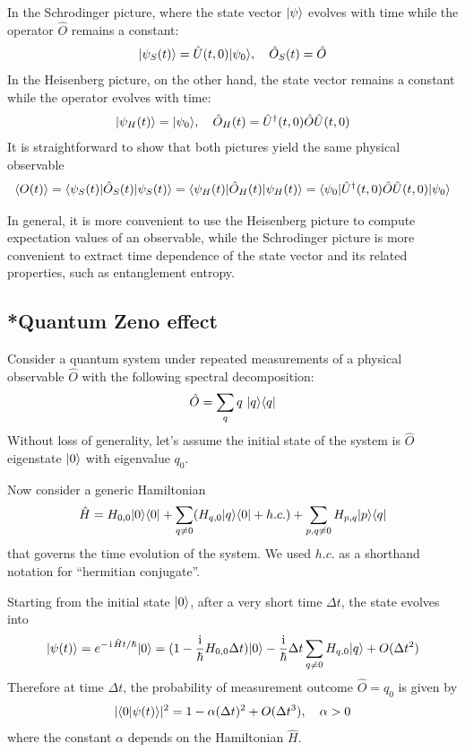 In the Schrodinger picture, where the state vector $|{\psi}\rangle$ evolves with time while the operator $\hat O$ remains a constant:
\begin{align}
    |{\psi_S(t)}\rangle=\hat U(t,0)|{\psi_0}\rangle,~~~\hat O_S(t)=\hat O
\end{align}
In the Heisenberg picture, on the other hand, the state vector remains a constant while the operator evolves with time:
\begin{align}
    |{\psi_H(t)}\rangle=|{\psi_0}\rangle,~~~\hat O_H(t)=\hat U^\dagger(t,0)\hat O\hat U(t,0)
\end{align}
It is straightforward to show that both pictures yield the same physical observable
\begin{align}
    \langle{O(t)}\rangle=\langle{\psi_S(t)|\hat O_S(t)|\psi_S(t)}\rangle=\langle{\psi_H(t)|\hat O_H(t)|\psi_H(t)}\rangle=\langle{\psi_0|\hat U^\dagger(t,0)\hat O\hat U(t,0)|\psi_0}\rangle
\end{align}

In general, it is more convenient to use the Heisenberg picture to compute expectation values of an observable, while the Schrodinger picture is more convenient to extract time dependence of the state vector and its related properties, such as entanglement entropy.

\subsection{*Quantum Zeno effect}

Consider a quantum system under repeated measurements of a physical observable $\hat O$ with the following spectral decomposition:
\begin{align}
    \hat O=\sum_q q~|{q}\rangle\langle{q}|
\end{align}
Without loss of generality, let's assume the initial state of the system is $\hat O$ eigenstate $|{0}\rangle$ with eigenvalue $q_0$. 

Now consider a generic Hamiltonian
\begin{align}
    \hat H=H_{0,0}|{0}\rangle\langle{0}|+\sum_{q\neq0}(H_{q,0}|{q}\rangle\langle{0}|+h.c.)+\sum_{p,q\neq0}H_{p,q}|{p}\rangle\langle{q}|
\end{align}
that governs the time evolution of the system. We used $h.c.$ as a shorthand notation for ``hermitian conjugate''. 

Starting from the initial state $|{0}\rangle$, after a very short time $\Delta t$, the state evolves into
\begin{align}
    |{\psi(t)}\rangle=e^{-\hspace{1pt}\mathrm{i}\hspace{1pt} \hat Ht/\hbar}|{0}\rangle=(1-\frac{\hspace{1pt}\mathrm{i}\hspace{1pt}}\hbar H_{0,0}\Delta t)|{0}\rangle-\frac{\hspace{1pt}\mathrm{i}\hspace{1pt}}\hbar\Delta t\sum_{q\neq0} H_{q,0}|{q}\rangle+O(\Delta t^2)
\end{align}
Therefore at time $\Delta t$, the probability of measurement outcome $\hat O=q_0$ is given by
\begin{align}
    |\langle{0|\psi(t)}\rangle|^2=1-\alpha(\Delta t)^2+O(\Delta t^3),~~~\alpha>0
\end{align}
where the constant $\alpha$ depends on the Hamiltonian $\hat H$. 

